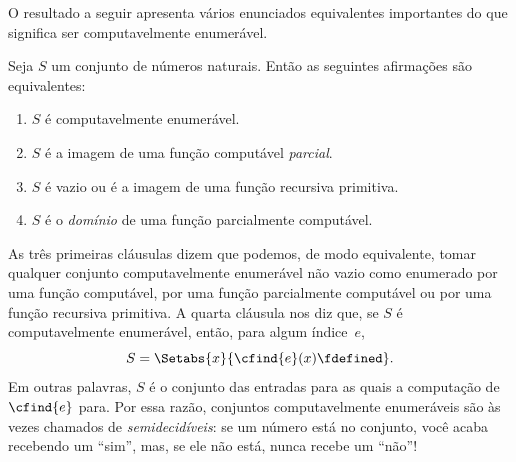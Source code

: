 \documentclass[../../../include/open-logic-section]{subfiles}
\begin{document}



O resultado a seguir apresenta vários enunciados equivalentes
importantes do que significa ser computavelmente enumerável.

\begin{thm}
Seja $S$ um conjunto de números naturais. Então as seguintes afirmações
são equivalentes:
\begin{enumerate}
\item{} $S$ é computavelmente enumerável.
\item{} $S$ é a imagem de uma função computável \emph{parcial}.
\item{} $S$ é vazio ou é a imagem de uma função recursiva primitiva.
\item{} $S$ é o \emph{domínio} de uma função parcialmente computável.
\end{enumerate}
\end{thm}

\begin{explain}
As três primeiras cláusulas dizem que podemos, de modo equivalente,
tomar qualquer conjunto computavelmente enumerável não vazio como
enumerado por uma função computável, por uma função parcialmente
computável ou por uma função recursiva primitiva. A quarta cláusula nos
diz que, se $S$ é computavelmente enumerável, então, para algum
índice~$e$,
\[
S = \Setabs{x}{\cfind{e}(x) \fdefined}.
\]
Em outras palavras, $S$ é o conjunto das entradas para as quais a
computação de $\cfind{e}$ para. Por essa razão, conjuntos
computavelmente enumeráveis são às vezes chamados de
\emph{semidecidíveis}: se um número está no conjunto, você acaba
recebendo um ``sim'', mas, se ele não está, nunca recebe um ``não''!{}
\end{explain}
\end{document}
